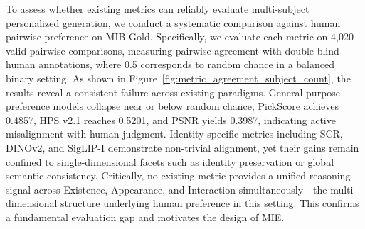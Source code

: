 \documentclass{article}
\begin{document}
To assess whether existing metrics can reliably evaluate multi-subject personalized generation, we conduct a systematic comparison against human pairwise preference on MIB-Gold. Specifically, we evaluate each metric on 4,020 valid pairwise comparisons, measuring pairwise agreement with double-blind human annotations, where 0.5 corresponds to random chance in a balanced binary setting. As shown in Figure~\ref{fig:metric_agreement_subject_count}, the results reveal a consistent failure across existing paradigms. General-purpose preference models collapse near or below random chance,  PickScore achieves 0.4857, HPS v2.1 reaches 0.5201, and PSNR yields 0.3987, indicating active misalignment with human judgment. Identity-specific metrics including SCR, DINOv2, and SigLIP-I demonstrate non-trivial alignment, yet their gains remain confined to single-dimensional facets such as identity preservation or global semantic consistency. Critically, no existing metric provides a unified reasoning signal across Existence, Appearance, and Interaction simultaneously—the multi-dimensional structure underlying human preference in this setting. This confirms a fundamental evaluation gap and motivates the design of MIE.

\end{document}
